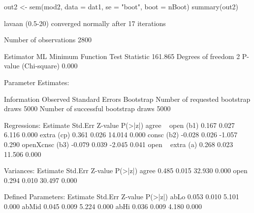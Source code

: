 \begin{Schunk}
\begin{Sinput}
 out2 <- sem(mod2, data = dat1, se = "boot", boot = nBoot)
 summary(out2)
\end{Sinput}
\begin{Soutput}
lavaan (0.5-20) converged normally after  17 iterations

  Number of observations                          2800

  Estimator                                         ML
  Minimum Function Test Statistic              161.865
  Degrees of freedom                                 2
  P-value (Chi-square)                           0.000

Parameter Estimates:

  Information                                 Observed
  Standard Errors                            Bootstrap
  Number of requested bootstrap draws             5000
  Number of successful bootstrap draws            5000

Regressions:
                   Estimate  Std.Err  Z-value  P(>|z|)
  agree ~                                             
    open      (b1)    0.167    0.027    6.116    0.000
    extra     (cp)    0.361    0.026   14.014    0.000
    consc     (b2)   -0.028    0.026   -1.057    0.290
    openXcnsc (b3)   -0.079    0.039   -2.045    0.041
  open ~                                              
    extra      (a)    0.268    0.023   11.506    0.000

Variances:
                   Estimate  Std.Err  Z-value  P(>|z|)
    agree             0.485    0.015   32.930    0.000
    open              0.294    0.010   30.497    0.000

Defined Parameters:
                   Estimate  Std.Err  Z-value  P(>|z|)
    abLo              0.053    0.010    5.101    0.000
    abMid             0.045    0.009    5.224    0.000
    abHi              0.036    0.009    4.180    0.000
\end{Soutput}
\end{Schunk}
